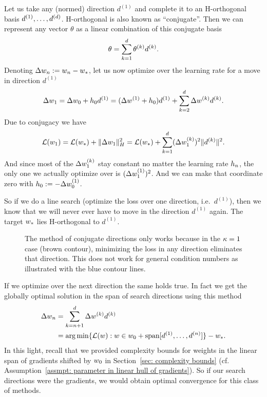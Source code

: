 Let us take any (normed) direction \(d^{(1)}\) and complete it to an H-orthogonal
basis \(d^{(1)},\dots,d^{(d)}\). H-orthogonal is also known as
``conjugate''. Then we can represent any vector \(\theta\) as a linear
combination of this conjugate basis
\begin{align*}
	\theta = \sum_{k=1}^d \theta^{(k)} d^{(k)}.
\end{align*}
Denoting \(\Delta w_n := w_n -w_*\), let us now optimize over
the learning rate for a move in direction \(d^{(1)}\)
\begin{align*}
	\Delta w_{1} = \Delta w_0 + h_0 d^{(1)}
	= (\Delta w^{(1)} + h_0)d^{(1)}
	+ \sum_{k=2}^d \Delta w^{(k)} d^{(k)}.
\end{align*}
Due to conjugacy we have
\begin{align*}
	\mathcal{L}(w_{1})
	= \mathcal{L}(w_*) + \|\Delta w_{1}\|_H^2
	= \mathcal{L}(w_*) + \sum_{k=1}^{d} (\Delta w_{1}^{(k)})^2\|d^{(k)}\|^2.
\end{align*}
And since most of the \(\Delta w^{(k)}_{1}\) stay constant no matter the
learning rate \(h_n\), the only one we actually optimize over is
\((\Delta w^{(1)}_{1})^2\).
And we can make that coordinate zero with \(h_0 :=-\Delta w_0^{(1)}\).

So if we do a line search (optimize the loss over one direction, i.e.\ \(d^{(1)}\)),
then we know that we will never ever have to move in the direction \(d^{(1)}\)
again. The target \(w_*\) lies H-orthogonal to \(d^{(1)}\).
%
\begin{figure}[h]
	\centering
	\def\svgwidth{1\textwidth}
	
	\caption{
		The method of conjugate directions only works because in the
		\(\kappa=1\) case (brown contour), minimizing the loss in any direction
		eliminates that direction. This does not work for general condition numbers
		as illustrated with the blue contour lines.
	}
	\label{fig: conjugate direction depends on condition one}
\end{figure}
%
If we optimize over the next direction the same holds true. In fact we get the
globally optimal solution in the span of search directions using this method 
\begin{align*}
	\Delta w_n &= \sum_{k=n+1}^d\Delta w^{(k)} d^{(k)}\\
	&= \arg\min \{
		\mathcal{L}(w) : w \in w_0 + \text{span}[d^{(1)},\dots, d^{(n)}]
	\} - w_*.
\end{align*}
In this light, recall that we provided complexity bounds for weights in the
linear span of gradients shifted by \(w_0\) in Section~\ref{sec: complexity bounds}
(cf. Assumption~\ref{assmpt: parameter in linear hull of gradients}). So if our
search directions were the gradients, we would obtain optimal convergence for
this class of methods.

